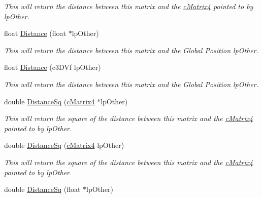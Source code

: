 \begin{DoxyCompactItemize}
\begin{DoxyCompactList}\small\item\em This will return the distance between this matrix and the \hyperlink{classc_matrix4}{cMatrix4} pointed to by lpOther. \end{DoxyCompactList}\item 
\hypertarget{classc_matrix4_a83fd4655f67a81cb42f3c50262ec593e}{
float \hyperlink{classc_matrix4_a83fd4655f67a81cb42f3c50262ec593e}{Distance} (float $\ast$lpOther)}
\label{classc_matrix4_a83fd4655f67a81cb42f3c50262ec593e}

\begin{DoxyCompactList}\small\item\em This will return the distance between this matrix and the Global Position lpOther. \end{DoxyCompactList}\item 
\hypertarget{classc_matrix4_a33661efb10e41c9e1f84a399113e235c}{
float \hyperlink{classc_matrix4_a33661efb10e41c9e1f84a399113e235c}{Distance} (c3DVf lpOther)}
\label{classc_matrix4_a33661efb10e41c9e1f84a399113e235c}

\begin{DoxyCompactList}\small\item\em This will return the distance between this matrix and the Global Position lpOther. \end{DoxyCompactList}\item 
\hypertarget{classc_matrix4_afb4a1edc36d2de9330e48bd182fe2a9b}{
double \hyperlink{classc_matrix4_afb4a1edc36d2de9330e48bd182fe2a9b}{DistanceSq} (\hyperlink{classc_matrix4}{cMatrix4} $\ast$lpOther)}
\label{classc_matrix4_afb4a1edc36d2de9330e48bd182fe2a9b}

\begin{DoxyCompactList}\small\item\em This will return the square of the distance between this matrix and the \hyperlink{classc_matrix4}{cMatrix4} pointed to by lpOther. \end{DoxyCompactList}\item 
\hypertarget{classc_matrix4_ad225d8db157a99b593f774e08c266722}{
double \hyperlink{classc_matrix4_ad225d8db157a99b593f774e08c266722}{DistanceSq} (\hyperlink{classc_matrix4}{cMatrix4} lpOther)}
\label{classc_matrix4_ad225d8db157a99b593f774e08c266722}

\begin{DoxyCompactList}\small\item\em This will return the square of the distance between this matrix and the \hyperlink{classc_matrix4}{cMatrix4} pointed to by lpOther. \end{DoxyCompactList}\item 
\hypertarget{classc_matrix4_ac524fac9525c6ff780e95c648b229e41}{
double \hyperlink{classc_matrix4_ac524fac9525c6ff780e95c648b229e41}{DistanceSq} (float $\ast$lpOther)}
\label{classc_matrix4_ac524fac9525c6ff780e95c648b229e41}


\end{DoxyCompactItemize}
